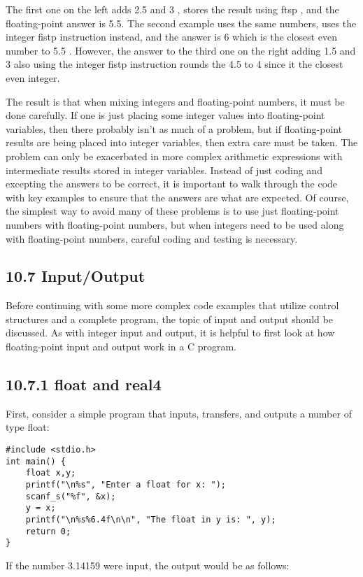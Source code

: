 \documentclass[10pt]{article}
\begin{document}
The first one on the left adds 2.5 and 3 , stores the result using ftsp , and the floating-point answer is 5.5. The second example uses the same numbers, uses the integer fistp instruction instead, and the answer is 6 which is the closest even number to 5.5 . However, the answer to the third one on the right adding 1.5 and 3 also using the integer fistp instruction rounds the 4.5 to 4 since it the closest even integer.

The result is that when mixing integers and floating-point numbers, it must be done carefully. If one is just placing some integer values into floating-point variables, then there probably isn't as much of a problem, but if floating-point results are being placed into integer variables, then extra care must be taken. The problem can only be exacerbated in more complex arithmetic expressions with intermediate results stored in integer variables. Instead of just coding and excepting the answers to be correct, it is important to walk through the code with key examples to ensure that the answers are what are expected. Of course, the simplest way to avoid many of these problems is to use just floating-point numbers with floating-point numbers, but when integers need to be used along with floating-point numbers, careful coding and testing is necessary.

\subsection*{10.7 Input/Output}
Before continuing with some more complex code examples that utilize control structures and a complete program, the topic of input and output should be discussed. As with integer input and output, it is helpful to first look at how floating-point input and output work in a C program.

\subsection*{10.7.1 float and real4}
First, consider a simple program that inputs, transfers, and outputs a number of type float:

\begin{verbatim}
#include <stdio.h>
int main() {
    float x,y;
    printf("\n%s", "Enter a float for x: ");
    scanf_s("%f", &x);
    y = x;
    printf("\n%s%6.4f\n\n", "The float in y is: ", y);
    return 0;
}
\end{verbatim}

If the number 3.14159 were input, the output would be as follows:
\end{document}
